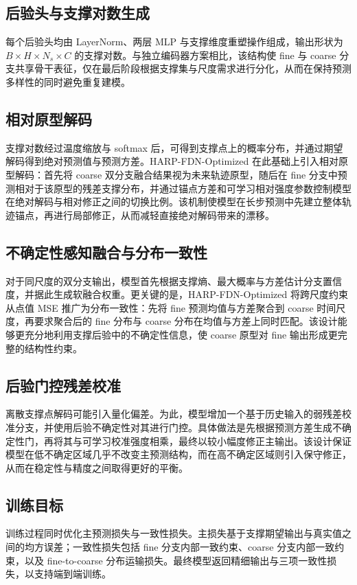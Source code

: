 \documentclass[journal]{IEEEtran}
\begin{document}
\subsection{后验头与支撑对数生成}
每个后验头均由 LayerNorm、两层 MLP 与支撑维度重塑操作组成，输出形状为 $B \times H \times N_s \times C$ 的支撑对数。与独立编码器方案相比，该结构使 fine 与 coarse 分支共享骨干表征，仅在最后阶段根据支撑集与尺度需求进行分化，从而在保持预测多样性的同时避免重复建模。

\subsection{相对原型解码}
\label{subsec:relative}
支撑对数经过温度缩放与 softmax 后，可得到支撑点上的概率分布，并通过期望解码得到绝对预测值与预测方差。HARP-FDN-Optimized 在此基础上引入相对原型解码：首先将 coarse 双分支融合结果视为未来轨迹原型，随后在 fine 分支中预测相对于该原型的残差支撑分布，并通过锚点方差和可学习相对强度参数控制模型在绝对解码与相对修正之间的切换比例。该机制使模型在长步预测中先建立整体轨迹锚点，再进行局部修正，从而减轻直接绝对解码带来的漂移。

\subsection{不确定性感知融合与分布一致性}
对于同尺度的双分支输出，模型首先根据支撑熵、最大概率与方差估计分支置信度，并据此生成软融合权重。更关键的是，HARP-FDN-Optimized 将跨尺度约束从点值 MSE 推广为分布一致性：先将 fine 预测均值与方差聚合到 coarse 时间尺度，再要求聚合后的 fine 分布与 coarse 分布在均值与方差上同时匹配。该设计能够更充分地利用支撑后验中的不确定性信息，使 coarse 原型对 fine 输出形成更完整的结构性约束。

\subsection{后验门控残差校准}
\label{subsec:calibration}
离散支撑点解码可能引入量化偏差。为此，模型增加一个基于历史输入的弱残差校准分支，并使用后验不确定性对其进行门控。具体做法是先根据预测方差生成不确定性门，再将其与可学习校准强度相乘，最终以较小幅度修正主输出。该设计保证模型在低不确定区域几乎不改变主预测结构，而在高不确定区域则引入保守修正，从而在稳定性与精度之间取得更好的平衡。

\subsection{训练目标}
训练过程同时优化主预测损失与一致性损失。主损失基于支撑期望输出与真实值之间的均方误差；一致性损失包括 fine 分支内部一致约束、coarse 分支内部一致约束，以及 fine-to-coarse 分布运输损失。最终模型返回精细输出与三项一致性损失，以支持端到端训练。
\end{document}
